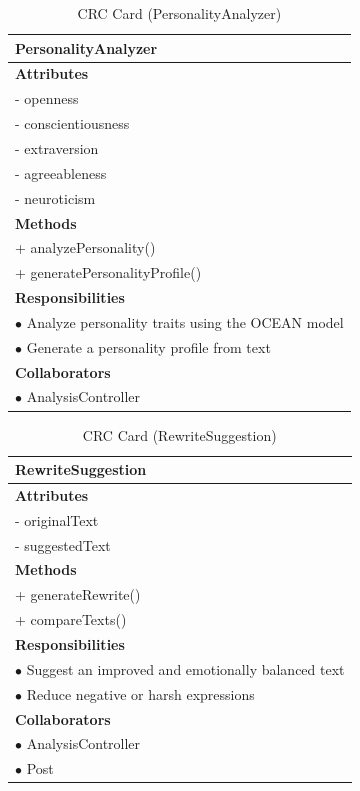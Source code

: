 \documentclass[12pt,a4paper]{report}
\begin{document}
\begin{table}[H]
\centering
\caption{CRC Card (PersonalityAnalyzer)}
\label{tab:crc_personality}
\begin{tabularx}{\textwidth}{|X|}
\hline
\textbf{PersonalityAnalyzer} \\
\hline
\textbf{Attributes} \\
- openness \\
- conscientiousness \\
- extraversion \\
- agreeableness \\
- neuroticism \\
\hline
\textbf{Methods} \\
+ analyzePersonality() \\
+ generatePersonalityProfile() \\
\hline
\textbf{Responsibilities} \\
$\bullet$ Analyze personality traits using the OCEAN model \\
$\bullet$ Generate a personality profile from text \\
\hline
\textbf{Collaborators} \\
$\bullet$ AnalysisController \\
\hline
\end{tabularx}
\end{table}

\begin{table}[H]
\centering
\caption{CRC Card (RewriteSuggestion)}
\label{tab:crc_rewrite}
\begin{tabularx}{\textwidth}{|X|}
\hline
\textbf{RewriteSuggestion} \\
\hline
\textbf{Attributes} \\
- originalText \\
- suggestedText \\
\hline
\textbf{Methods} \\
+ generateRewrite() \\
+ compareTexts() \\
\hline
\textbf{Responsibilities} \\
$\bullet$ Suggest an improved and emotionally balanced text \\
$\bullet$ Reduce negative or harsh expressions \\
\hline
\textbf{Collaborators} \\
$\bullet$ AnalysisController \\
$\bullet$ Post \\
\hline
\end{tabularx}
\end{table}
\end{document}
